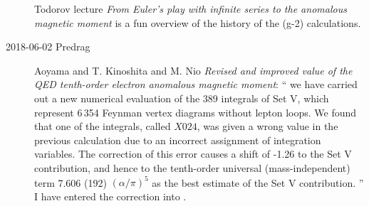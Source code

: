 \begin{description}
Todorov lecture {\em From {Euler}'s play with infinite series to
the anomalous magnetic moment} is a fun overview of the history of the (g-2)
calculations.

\item[2018-06-02 Predrag]
Aoyama and T. Kinoshita and M. Nio {\em Revised and improved value
of the {QED} tenth-order electron anomalous magnetic moment}:
``
we have carried out a new numerical evaluation of the 389 integrals of Set V,
which represent 6\,354 Feynman vertex diagrams without lepton loops. We found
that one of the integrals, called $X024$, was given a wrong value in the
previous calculation due to an incorrect assignment of integration variables.
The correction of this error causes a shift of -1.26 to the Set V contribution,
and hence to the tenth-order universal (mass-independent) term 7.606
(192) $(\alpha/{\pi})^5$ as the best estimate of the Set V contribution.
''
I have entered the correction into .



\end{description}
